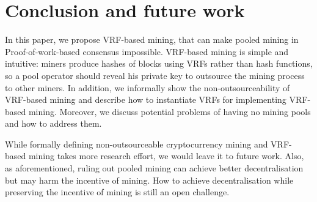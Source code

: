 \section{Conclusion and future work}
\label{sec:conclusion}

In this paper, we propose VRF-based mining, that can make pooled mining in Proof-of-work-based consensus impossible.
VRF-based mining is simple and intuitive: miners produce hashes of blocks using VRFs rather than hash functions, so a pool operator should reveal his private key to outsource the mining process to other miners.
In addition, we informally show the non-outsourceability of VRF-based mining and describe how to instantiate VRFs for implementing VRF-based mining.
Moreover, we discuss potential problems of having no mining pools and how to address them.

While formally defining non-outsourceable cryptocurrency mining and VRF-based mining takes more research effort, we would leave it to future work.
Also, as aforementioned, ruling out pooled mining can achieve better decentralisation but may harm the incentive of mining.
How to achieve decentralisation while preserving the incentive of mining is still an open challenge.
